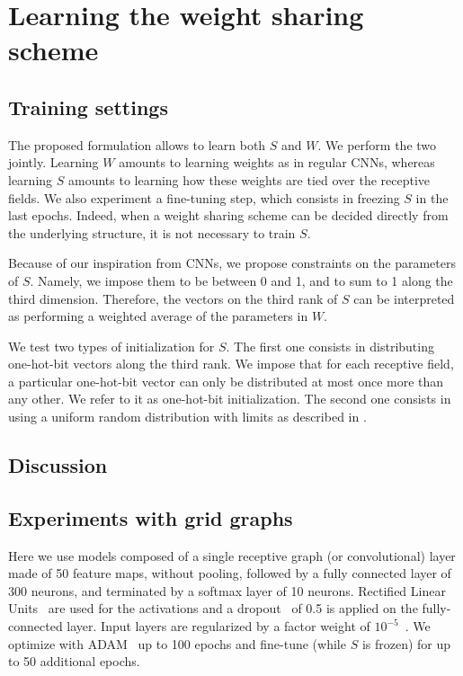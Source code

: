 \section{Learning the weight sharing scheme}

\subsection{Training settings}

The proposed formulation allows to learn both $S$ and $W$. We perform the two jointly. Learning $W$ amounts to learning weights as in regular CNNs, whereas learning $S$ amounts to learning how these weights are tied over the receptive fields. We also experiment a fine-tuning step, which consists in freezing $S$ in the last epochs. Indeed, when a weight sharing scheme can be decided directly from the underlying structure, it is not necessary to train $S$.

Because of our inspiration from CNNs, we propose constraints on the parameters of $S$. Namely, we impose them to be between 0 and 1, and to sum to 1 along the third dimension. Therefore, the vectors on the third rank of $S$ can be interpreted as performing a weighted average of the parameters in $W$.

We test two types of initialization for $S$. The first one consists in distributing one-hot-bit vectors along the third rank. We impose that for each receptive field, a particular one-hot-bit vector can only be distributed at most once more than any other. We refer to it as one-hot-bit initialization. The second one consists in using a uniform random distribution with limits as described in \cite{glorot2010understanding}.

\subsection{Discussion}

\todo{}

\subsection{Experiments with grid graphs}

Here we use models composed of a single receptive graph (or convolutional) layer made of 50 feature maps, without pooling, followed by a fully connected layer of 300 neurons, and terminated by a softmax layer of 10 neurons. Rectified Linear Units~\cite{glorot2011deep} are used for the activations and a dropout~\cite{srivastava2014dropout} of 0.5 is applied on the fully-connected layer. Input layers are regularized by a factor weight of $10^{-5}$~\cite{ng2004feature}. We optimize with ADAM~\cite{kingma2014adam} up to 100 epochs and fine-tune (while $S$ is frozen) for up to 50 additional epochs.

